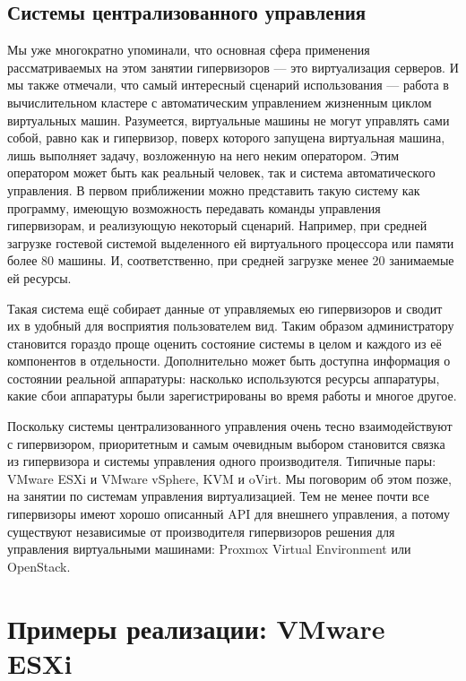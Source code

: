 \documentclass[14pt, a4paper]{article}
\begin{document}
\subsection*{Системы централизованного управления}

Мы уже многократно упоминали, что основная сфера применения рассматриваемых на этом занятии
гипервизоров — это виртуализация серверов. И мы также отмечали, что самый интересный сценарий
использования — работа в вычислительном кластере с автоматическим управлением жизненным
циклом виртуальных машин. Разумеется, виртуальные машины не могут управлять сами собой, равно
как и гипервизор, поверх которого запущена виртуальная машина, лишь выполняет задачу,
возложенную на него неким оператором. Этим оператором может быть как реальный человек, так и
система автоматического управления. В первом приближении можно представить такую систему как
программу, имеющую возможность передавать команды управления гипервизорам, и реализующую
некоторый сценарий. Например, при средней загрузке гостевой системой выделенного ей
виртуального процессора или памяти более 80%
машины. И, соответственно, при средней загрузке менее 20%
занимаемые ей ресурсы.

Такая система ещё собирает данные от управляемых ею гипервизоров и сводит их в удобный для
восприятия пользователем вид. Таким образом администратору становится гораздо проще оценить
состояние системы в целом и каждого из её компонентов в отдельности. Дополнительно может быть
доступна информация о состоянии реальной аппаратуры: насколько используются ресурсы
аппаратуры, какие сбои аппаратуры были зарегистрированы во время работы и многое другое.

Поскольку системы централизованного управления очень тесно взаимодействуют с гипервизором,
приоритетным и самым очевидным выбором становится связка из гипервизора и системы управления
одного производителя. Типичные пары: VMware ESXi и VMware vSphere, KVM и oVirt. Мы поговорим об
этом позже, на занятии по системам управления виртуализацией. Тем не менее почти все
гипервизоры имеют хорошо описанный API для внешнего управления, а потому существуют
независимые от производителя гипервизоров решения для управления виртуальными машинами:
Proxmox Virtual Environment или OpenStack. \newpage

\section*{Примеры реализации: VMware ESXi}
\end{document}
